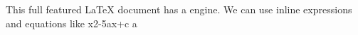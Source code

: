 \markdownRendererUlBeginTight
\markdownRendererUlItem This full featured LaTeX document has a  engine.\markdownRendererUlItemEnd 
\markdownRendererUlItem We can use \markdownRendererDollarSign{}inline\markdownRendererDollarSign{} expressions and equations like \markdownRendererDollarSign{}x\markdownRendererCircumflex{}2-5ax+c\markdownRendererDollarSign{} a\markdownRendererUlItemEnd 
\markdownRendererUlEndTight \relax
